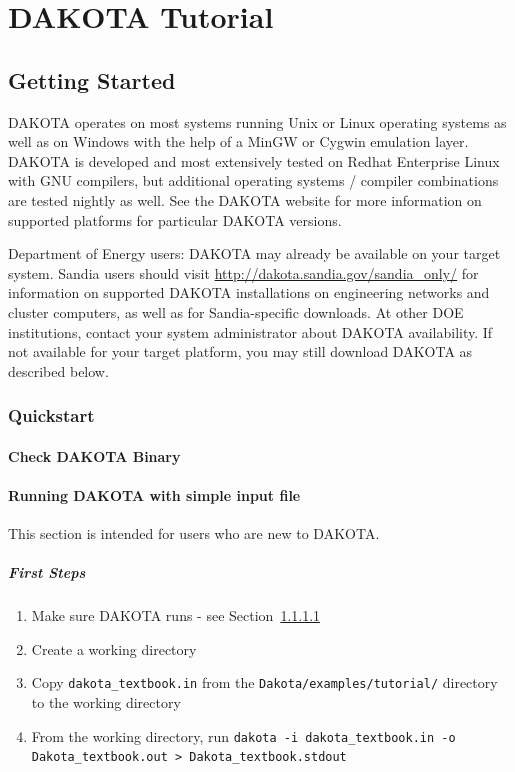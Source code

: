 \chapter{DAKOTA Tutorial}\label{tutorial}

\section{Getting Started}\label{tutorial:installation}

DAKOTA operates on most systems running Unix or Linux operating
systems as well as on Windows with the help of a MinGW or Cygwin
emulation layer.  DAKOTA is developed and most extensively tested on
Redhat Enterprise Linux with GNU compilers, but additional operating
systems / compiler combinations are tested nightly as well.  See the
DAKOTA website for more information on supported platforms for
particular DAKOTA versions.

Department of Energy users: DAKOTA may already be available on your
target system. Sandia users should visit
\url{http://dakota.sandia.gov/sandia_only/} for information on
supported DAKOTA installations on engineering networks and cluster
computers, as well as for Sandia-specific downloads.  At other DOE
institutions, contact your system administrator about DAKOTA
availability.  If not available for your target platform, you may
still download DAKOTA as described below.

\subsection {Quickstart}\label{tutorial:installation:quickstart}
\subsubsection {Check DAKOTA Binary}\label{tutorial:installation:quickstart:binary}

\subsubsection {Running DAKOTA with simple input file}\label{tutorial:installation:quickstart:running}
This section is intended for users who are new to DAKOTA.

\paragraph{First Steps}
\begin{enumerate}
  \item Make sure DAKOTA runs - see Section~\ref{tutorial:installation:quickstart:binary}
  \item Create a working directory 
  \item Copy \texttt{dakota\_textbook.in} from the \texttt{Dakota/examples/tutorial/} directory to the working directory
  \item From the working directory, run \texttt{dakota -i dakota\_textbook.in -o Dakota\_textbook.out > Dakota\_textbook.stdout}
\end{enumerate}


